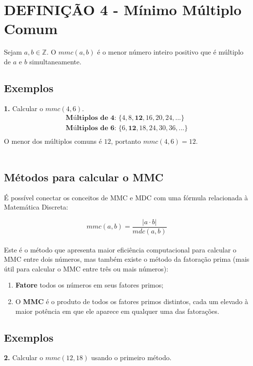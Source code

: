 \section{DEFINIÇÃO 4 - Mínimo Múltiplo Comum}
Sejam $a, b \in \mathbb{Z}$. O $mmc(a,b)$ é o menor número inteiro positivo que é múltiplo de $a$ e $b$ simultaneamente.

\subsection*{Exemplos}
\textbf{1.} Calcular o $mmc(4,6)$.
\begin{align*}
    \textbf{Múltiplos de 4: } \{4,8,\mathbf{12},16,20,24,...\}  \\
    \textbf{Múltiplos de 6: } \{6,\mathbf{12},18,24,30,36,...\} \\
\end{align*}
O menor dos múltiplos comuns é $12$, portanto $mmc(4,6) = 12$.\\
\vspace{-10pt}\\

\subsection{Métodos para calcular o MMC}
É possível conectar os conceitos de MMC e MDC com uma fórmula relacionada à Matemática Discreta:

\[
    mmc(a,b) = \frac{|a \cdot b|}{mdc(a,b)}
\]
\\
Este é o método que apresenta maior eficiência computacional para calcular o MMC entre dois números, mas também existe o método da fatoração prima (mais útil para calcular o MMC entre três ou mais números):

\begin{enumerate}
    \item \textbf{Fatore} todos os números em seus fatores primos;
    \item O \textbf{MMC} é o produto de todos os fatores primos distintos, cada um elevado à maior potência em que ele aparece em qualquer uma das fatorações.
\end{enumerate}

\subsection*{Exemplos}
\textbf{2.} Calcular o $mmc(12,18)$ usando o primeiro método.

